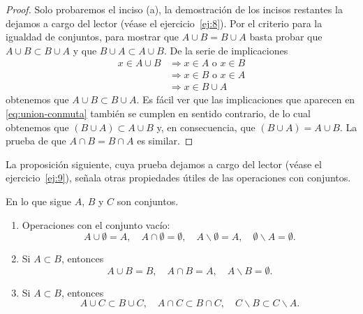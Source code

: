 \documentclass[12pt,a4paper]{book}
\begin{document}
    \begin{proof}
        Solo probaremos el inciso (a), la demostración de los incisos
        restantes la dejamos a cargo del lector (véase el ejercicio~\ref{ej:8}). Por el criterio
        para la igualdad de conjuntos, para mostrar que $A\cup B=B\cup A$ basta probar
        que $A\cup B\subset B\cup A$ y que $B\cup A\subset A\cup B$. De la serie de implicaciones
        \begin{equation}\label{eq:union-conmuta}
            \begin{aligned}
                x\in A\cup B&\Rightarrow x\in A\text{ o }x\in B\\
                &\Rightarrow x\in B\text{ o }x\in A\\
                &\Rightarrow x\in B\cup A
            \end{aligned}
        \end{equation}
        obtenemos que $A\cup B\subset B\cup A$. Es fácil ver que las implicaciones que aparecen
        en \eqref{eq:union-conmuta} también se cumplen en sentido contrario, de lo cual obtenemos que
        $(B\cup A)\subset A\cup B$ y, en consecuencia, que $(B\cup A)=A\cup B$. La prueba de que
        $A\cap B=B\cap A$ es similar.
    \end{proof}

    La proposición siguiente, cuya prueba dejamos a cargo del lector (véase el
    ejercicio~\ref{ej:9}), señala otras propiedades útiles de las operaciones con conjuntos.

    \begin{proposicion}\label{prop:3}
        En lo que sigue $A$, $B$ y $C$ son conjuntos.
        \begin{enumerate}
            \item Operaciones con el conjunto vacío:
            \begin{equation*}
                A\cup\emptyset=A,\quad A\cap\emptyset=\emptyset,\quad A\backslash\emptyset=A,\quad \emptyset\backslash A=\emptyset.
            \end{equation*}
            \item Si $A\subset B$, entonces
            \begin{equation*}
                A\cup B=B,\quad A\cap B=A,\quad A\backslash B=\emptyset.
            \end{equation*}
            \item Si $A\subset B$, entonces
            \begin{equation*}
                A\cup C\subset B\cup C,\quad A\cap C\subset B\cap C,\quad C\backslash B\subset C\backslash A.
            \end{equation*}
        \end{enumerate}
    \end{proposicion}
\end{document}

